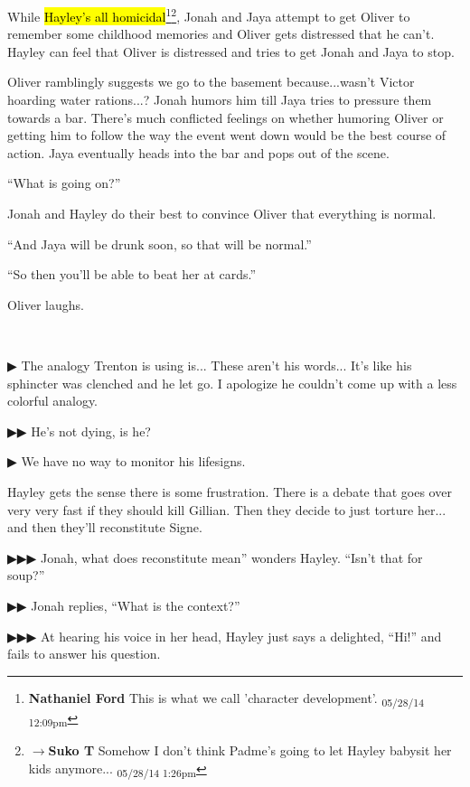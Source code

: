 While \hl{Hayley's all homicidal}\footnote{\textbf{Nathaniel Ford }This is what we call 'character development'. \textsubscript{05/28/14 12:09pm}}\footnote{$\rightarrow$\textbf{Suko T }Somehow I don't think Padme's going to let Hayley babysit her kids anymore... \textsubscript{05/28/14 1:26pm}}, Jonah and Jaya attempt to get Oliver to remember some childhood memories and Oliver gets distressed that he can't.  Hayley can feel that Oliver is distressed and tries to get Jonah and Jaya to stop.



Oliver ramblingly suggests we go to the basement because...wasn't Victor hoarding water rations...?  Jonah humors him till Jaya tries to pressure them towards a bar. There's much conflicted feelings on whether humoring Oliver or getting him to follow the way the event went down would be the best course of action.  Jaya eventually heads into the bar and pops out of the scene. 



``What is going on?''

Jonah and Hayley do their best to convince Oliver that everything is normal.

``And Jaya will be drunk soon, so that will be normal.''

``So then you'll be able to beat her at cards.''

Oliver laughs.


{\parskip=0pt
~

 {\color[RGB]{68,68,68}▶}  The analogy Trenton is using is... These aren't his words... It's like his sphincter was clenched and he let go.  I apologize he couldn't come up with a less colorful analogy.  

 {\color[RGB]{68,68,68}▶▶ } He's not dying, is he?

 {\color[RGB]{68,68,68}▶ } We have no way to monitor his lifesigns. 



 Hayley gets the sense there is some frustration.  There is a debate that goes over very very fast if they should kill Gillian.  Then they decide to just torture her... and then they'll reconstitute Signe. 



 {\color[RGB]{68,68,68}▶▶▶  } Jonah, what does reconstitute mean'' wonders Hayley.  ``Isn't that for soup?''

 {\color[RGB]{68,68,68}▶▶ } Jonah replies, ``What is the context?''

 {\color[RGB]{68,68,68}▶▶▶ } At hearing his voice in her head, Hayley just says a delighted, ``Hi!'' and fails to answer his question.
}




